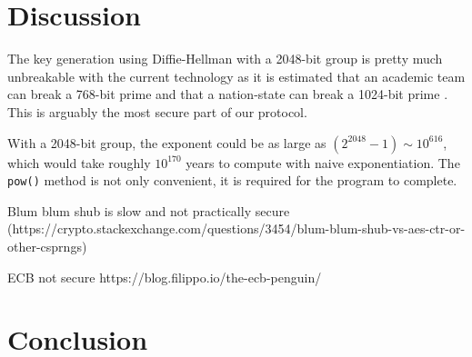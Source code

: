 \documentclass{article}
\begin{document}
\section{Discussion}

The key generation using Diffie-Hellman with a 2048-bit group is pretty much unbreakable with the current technology as it is estimated that an academic team can break a 768-bit prime and that a nation-state can break a 1024-bit prime \cite{weakdh15}. This is arguably the most secure part of our protocol. 

With a 2048-bit group, the exponent could be as large as $(2^{2048}-1) \sim 10^{616}$, which would take roughly $10^{170}$ years to compute with naive exponentiation. The \verb+pow()+ method is not only convenient, it is required for the program to complete.


Blum blum shub is slow and not practically secure (https://crypto.stackexchange.com/questions/3454/blum-blum-shub-vs-aes-ctr-or-other-csprngs)

ECB not secure
https://blog.filippo.io/the-ecb-penguin/

\section{Conclusion}





\end{document}
